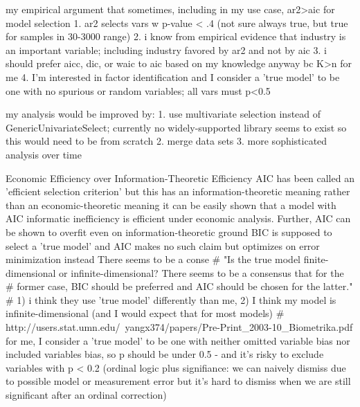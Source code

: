 \documentclass[review]{elsarticle}
\begin{document}
my empirical argument that sometimes, including in my use case, ar2>aic for model selection
1. ar2 selects vars w p-value < .4 (not sure always true, but true for samples in 30-3000 range)
2. i know from empirical evidence that industry is an important variable; including industry favored by ar2 and not by aic
3. i should prefer aicc, dic, or waic to aic based on my knowledge anyway bc K>n for me
4. I'm interested in factor identification and I consider a 'true model' to be one with no spurious or random variables; all vars must p<0.5

my analysis would be improved by:
  1. use multivariate selection instead of GenericUnivariateSelect; currently no widely-supported library seems to exist so this would need to be from scratch
  2. merge data sets
  3. more sophisticated analysis over time


Economic Efficiency over Information-Theoretic Efficiency
AIC has been called an 'efficient selection criterion' but this has an information-theoretic meaning rather than an economic-theoretic meaning
it can be easily shown that a model with AIC informatic inefficiency is efficient under economic analysis.
Further, AIC can be shown to overfit even on information-theoretic ground
BIC is supposed to select a 'true model' and AIC makes no such claim but optimizes on error minimization instead
There seems to be a conse
# "Is the true model finite-dimensional or infinite-dimensional? There seems to be a consensus that for the
#   former case, BIC should be preferred and AIC should be chosen for the latter."
# 1) i think they use 'true model' differently than me, 2) I think my model is infinite-dimensional (and I would expect that for most models)
# http://users.stat.umn.edu/~yangx374/papers/Pre-Print_2003-10_Biometrika.pdf
for me, I consider a 'true model' to be one with neither omitted variable bias nor included variables bias, so p should be under 0.5
  - and it's risky to exclude variables with p < 0.2 (ordinal logic plus signifiance:
  we can naively dismiss due to possible model or measurement error
  but it's hard to dismiss when we are still significant after an ordinal correction)
\end{document}
